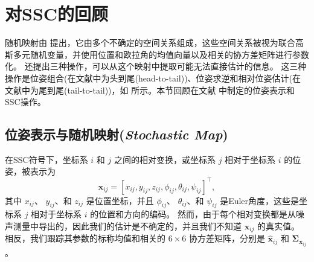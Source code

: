 \FloatBarrier

\section{对SSC的回顾}
\label{sec:SSC}

随机映射由 \citet{smith1990a} 提出，它由多个不确定的空间关系组成，这些空间关系被视为联合高斯多元随机变量，并使用位置和欧拉角的均值向量以及相关的协方差矩阵进行参数化。\citet{smith1990a} 还提出三种操作，可以从这个映射中提取可能无法直接估计的信息。 
这三种操作是位姿组合(在文献\cite{smith1990a}中为头到尾(head-to-tail))、位姿求逆和相对位姿估计(在文献\cite{smith1990a}中为尾到尾(tail-to-tail))，如  所示。本节回顾在文献 \cite{smith1990a} 中制定的位姿表示和SSC操作。 


\subsection{位姿表示与随机映射(\textit{Stochastic Map})}

在SSC符号下，坐标系 $i$ 和 $j$ 之间的相对变换，或坐标系 $j$ 相对于坐标系 $i$ 的位姿，被表示为 
\begin{equation}
    \mathbf{x}_{ij} = [x_{ij}, y_{ij}, z_{ij}, \phi_{ij}, \theta_{ij}, \psi_{ij}]^\top, \label{eq:SSC_rep}
\end{equation}
其中 $x_{ij}$、 $y_{ij}$、和 $z_{ij}$ 是位置坐标，并且 $\phi_{ij}$、 $\theta_{ij}$、和 $\psi_{ij}$ 是Euler角度，这些是坐标系 $j$ 相对于坐标系 $i$ 的位置和方向的编码。 
然而，由于每个相对变换都是从噪声测量中导出的，因此我们的估计是不确定的，并且我们不知道 $\mathbf{x}_{ij}$ 的真实值。 
相反，我们跟踪其参数的标称均值和相关的 $6\times 6$ 协方差矩阵，分别是 $\hat{\mathbf{x}}_{ij}$ 和 $\boldsymbol{\Sigma}_{\mathbf{x}_{ij}}$。 

